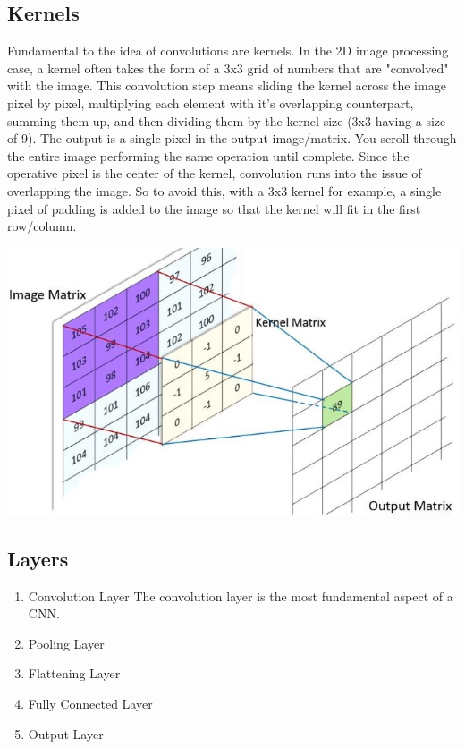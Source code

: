 \documentclass{article}
\begin{document}
    \subsection{Kernels}
        Fundamental to the idea of convolutions are kernels. In the 2D image processing case, a kernel often takes the form of a 3x3 grid of numbers that are "convolved" with the image. This convolution step means sliding the kernel across the image pixel by pixel, multiplying each element with it's overlapping counterpart, summing them up, and then dividing them by the kernel size (3x3 having a size of 9). The output is a single pixel in the output image/matrix. You scroll through the entire image performing the same operation until complete. Since the operative pixel is the center of the kernel, convolution runs into the issue of overlapping the image. So to avoid this, with a 3x3 kernel for example, a single pixel of padding is added to the image so that the kernel will fit in the first row/column.
        \begin{center}
            \includegraphics[scale=0.6]{images/kernel.jpg}
        \end{center}
    \subsection{Layers}
        \begin{enumerate}[label=(\alph*)]
            \item Convolution Layer
            The convolution layer is the most fundamental aspect of a CNN.
            \item Pooling Layer
            \item Flattening Layer
            \item Fully Connected Layer
            \item Output Layer                
        \end{enumerate}
\end{document}
